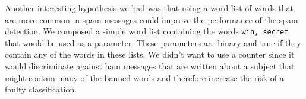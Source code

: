   Another interesting hypothesis we had was that using a word list of words
  that are more common in spam messages could improve the performance of the
  spam detection. We composed a simple word list containing the words
  \texttt{win, secret} that would be used as a parameter.  These parameters are
  binary and true if they contain any of the words in these lists. We didn't
  want to use a counter since it would discriminate against ham messages that
  are written about a subject that might contain many of the banned words and
  therefore increase the risk of a faulty classification. 




